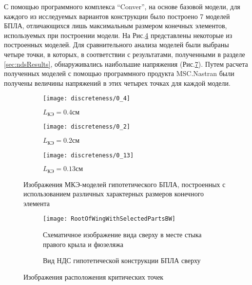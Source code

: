 С помощью программного комплекса ``Conver'', на основе базовой модели, для каждого из исследуемых вариантов конструкции было построено 7 моделей БПЛА, отличающихся лишь максимальным размером конечных элементов, используемых при построении модели. На Рис.\ref{fig:discreteness} представлены некоторые из построенных моделей. Для сравнительного анализа моделей были выбраны четыре точки, в которых, в соответствии с результатами, полученными в разделе \ref{sec:ndsResults}, обнаруживались наибольшие напряжения (Рис.\ref{fig:criticalPointsBoth}). Путем расчета полученных моделей с помощью программного продукта MSC.Nastran были получены величины напряжений в этих четырех точках для каждой модели.


\begin{figure}[ht]
\captionsetup{justification=centering}
\centering
	\begin{subfigure}[b]{0.8\textwidth}
	\texttt{[image: discreteness/0\_4]}
	\caption{$L_\text{КЭ} = 0.4см$}
	\label{fig:discr:0_4}
	\end{subfigure}
	\begin{subfigure}[b]{0.8\textwidth}
	\texttt{[image: discreteness/0\_2]}
	\caption{$L_\text{КЭ} = 0.2см$}
	\label{fig:discr:0_2}
	\end{subfigure}
	\begin{subfigure}[b]{0.8\textwidth}
	\texttt{[image: discreteness/0\_13]}
	\caption{$L_\text{КЭ} = 0.13см$}
	\label{fig:discr:0_13}
	\end{subfigure}
\caption{Изображения МКЭ-моделей гипотетического БПЛА, построенных с использованием различных характерных размеров конечного элемента}
\label{fig:discreteness}
\end{figure}


\begin{figure}[ht]
	\centering
	\begin{subfigure}[b]{0.47\textwidth}
	\def\svgwidth{\textwidth}
	\texttt{[image: RootOfWingWithSelectedPartsBW]}
	\caption{Схематичное изображение вида сверху в месте стыка правого крыла и фюзеляжа}
	\label{fig:WingRootPlain}	
	\end{subfigure}
	\begin{subfigure}[b]{0.47\textwidth}
	\def\svgwidth{\textwidth}
	
	\caption{Вид НДС гипотетической конструкции БПЛА сверху}
	\label{fig:criticalPoints}	
	\end{subfigure}
\caption{Изображения расположения критических точек}
\label{fig:criticalPointsBoth}
\end{figure}

